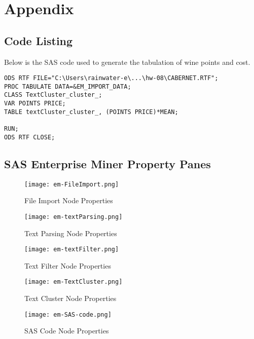 \documentclass[12pt]{article}
\begin{document}
\section{Appendix}




\subsection{Code Listing}
Below is the SAS code used to generate the tabulation of wine points and cost.

{\tiny{}}
\begin{lstlisting}
ODS RTF FILE="C:\Users\rainwater-e\...\hw-08\CABERNET.RTF";
PROC TABULATE DATA=&EM_IMPORT_DATA;
CLASS TextCluster_cluster_;
VAR POINTS PRICE;
TABLE textCluster_cluster_, (POINTS PRICE)*MEAN;

RUN;
ODS RTF CLOSE;
\end{lstlisting}
\pagebreak


\subsection{SAS Enterprise Miner Property Panes}
\nopagebreak[4]
\begin{figure}[H]
	\texttt{[image: em-FileImport.png]}
	\caption{File Import Node Properties}
	\label{fig:fileImp}
\end{figure}


\begin{figure}
	\texttt{[image: em-textParsing.png]}
	\caption{Text Parsing Node Properties}
	\label{fig:textPars}
\end{figure}

\begin{figure}
	\label{fig:textFilt}
	\texttt{[image: em-textFilter.png]}
	\caption{Text Filter Node Properties}
\end{figure}

\begin{figure}
	\label{fig:textClus}
	\texttt{[image: em-TextCluster.png]}
	\caption{Text Cluster Node Properties}
\end{figure}

\begin{figure}
	\label{fig:sasCode}
	\texttt{[image: em-SAS-code.png]}
	\caption{SAS Code Node Properties}
\end{figure}
\end{document}
